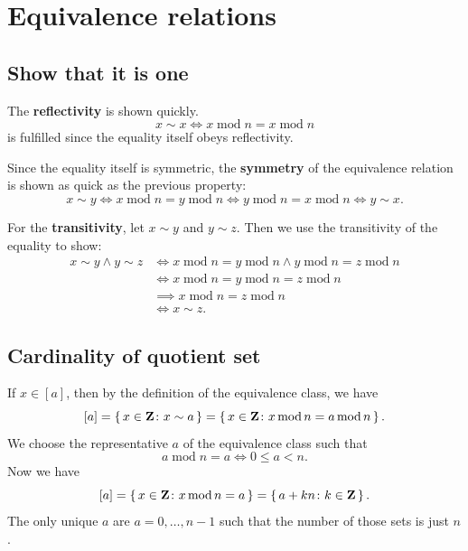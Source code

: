 \documentclass[11pt, english, fleqn, DIV=15, headinclude, BCOR=1cm]{scrartcl}
\begin{document}
\section{Equivalence relations}

\subsection{Show that it is one}

\renewcommand\mod{\operatorname{mod}}

The \textbf{reflectivity} is shown quickly.
\[
    x \sim x \iff x \mod n = x \mod n
\]
is fulfilled since the equality itself obeys reflectivity.

Since the equality itself is symmetric, the \textbf{symmetry} of the
equivalence relation is shown as quick as the previous property:
\[
    x \sim y
    \iff
    x \mod n = y \mod n
    \iff
    y \mod n = x \mod n
    \iff
    y \sim x.
\]

For the \textbf{transitivity}, let $x \sim y$ and $y \sim z$. Then we use the
transitivity of the equality to show:
\begin{align*}
    x \sim y \land y \sim z
    &\iff
    x \mod n = y \mod n
    \land
    y \mod n = z \mod n \\
    &\iff
    x \mod n = y \mod n = z \mod n \\
    &\implies
    x \mod n = z \mod n \\
    &\iff
    x \sim z.
\end{align*}

\subsection{Cardinality of quotient set}

If $x \in [a]$, then by the definition of the equivalence class, we have
\[
    [a] = \set{x \in \Z \colon x \sim a}
    = \set{x \in \Z \colon x \mod n = a \mod n}.
\]
We choose the representative $a$ of the equivalence class such that
\[
    a \mod n = a
    \iff
    0 \leq a < n.
\]
Now we have
\[
    [a]
    = \set{x \in \Z \colon x \mod n = a}
    = \set{a + kn \colon k \in \Z}.
\]
The only unique $a$ are $a = 0, \ldots, n-1$ such that the number of those sets
is just $n$.
\end{document}
